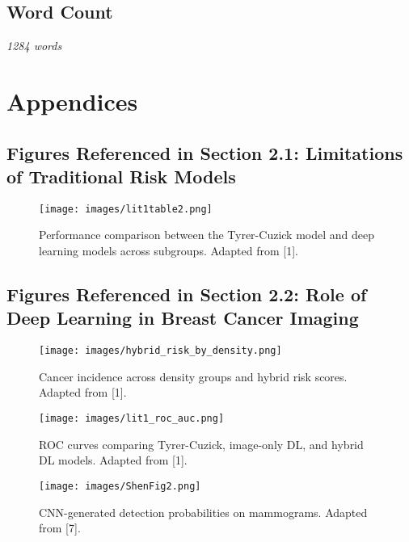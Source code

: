 \documentclass[12pt]{article}
\begin{document}
\subsection*{Word Count}
\textit{\small 1284 words}



\newpage
\section{Appendices}

\subsection{Figures Referenced in Section 2.1: Limitations of Traditional Risk Models}

\begin{figure}[H]
    \centering
    \texttt{[image: images/lit1table2.png]}
    \caption{Performance comparison between the Tyrer-Cuzick model and deep learning models across subgroups. Adapted from [1].}
    \label{fig:lit1table2}
\end{figure}

\subsection{Figures Referenced in Section 2.2: Role of Deep Learning in Breast Cancer Imaging}

\begin{figure}[H]
    \centering
    \texttt{[image: images/hybrid\_risk\_by\_density.png]}
    \caption{Cancer incidence across density groups and hybrid risk scores. Adapted from [1].}
    \label{fig:hybrid_density}
\end{figure}

\begin{figure}[H]
    \centering
    \texttt{[image: images/lit1\_roc\_auc.png]}
    \caption{ROC curves comparing Tyrer-Cuzick, image-only DL, and hybrid DL models. Adapted from [1].}
    \label{fig:lit1roc}
\end{figure}

\begin{figure}[H]
    \centering
    \texttt{[image: images/ShenFig2.png]}
    \caption{CNN-generated detection probabilities on mammograms. Adapted from [7].}
    \label{fig:shen2019}
\end{figure}
\end{document}
